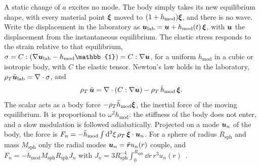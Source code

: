 A static change of $a$ excites no mode. The body simply takes its new equilibrium shape, with every material point $\bm{\xi}$ moved to $(1 + h_{\mathrm{mod}})\bm{\xi}$, and there is no wave. Write the displacement in the laboratory as $\bm{u}_{\mathrm{lab}} = \bm{u} + h_{\mathrm{mod}}(t)\,\bm{\xi}$, with $\bm{u}$ the displacement from the instantaneous equilibrium. The elastic stress responds to the strain relative to that equilibrium, $\sigma = C : (\nabla\vect{u}_{\mathrm{lab}} - h_{\mathrm{mod}}\mathbb{1}) = C : \nabla\vect{u}$, for a uniform $h_{\mathrm{mod}}$ in a cubic or isotropic body, with $C$ the elastic tensor. Newton's law holds in the laboratory, $\rho_T\ddot{\bm{u}}_{\mathrm{lab}} = \nabla\cdot\sigma$, and
\begin{equation}
  \rho_T\,\ddot{\bm{u}} = \nabla\cdot(C : \nabla\bm{u}) - \rho_T\,\ddot h_{\mathrm{mod}}\,\bm{\xi} .
  \label{eq:11.8-drive}
\end{equation}
The scalar acts as a body force $-\rho_T\ddot h_{\mathrm{mod}}\bm{\xi}$, the inertial force of the moving equilibrium. It is proportional to $\omega^2h_{\mathrm{mod}}$: the stiffness of the body does not enter, and a slow modulation is followed adiabatically. Projected on a mode $\bm{u}_n$ of the body, the force is $F_n = -\ddot h_{\mathrm{mod}}\int\mathrm{d}^3\xi\,\rho_T\,\bm{\xi}\cdot\bm{u}_n$. For a sphere of radius $R_{\mathrm{sph}}$ and mass $M_{\mathrm{sph}}$ only the radial modes $\bm{u}_n = \hat{\bm{r}}u_n(r)$ couple, and $F_n = -\ddot h_{\mathrm{mod}}M_{\mathrm{sph}}R_{\mathrm{sph}}J_n$ with $J_n = 3R_{\mathrm{sph}}^{-4}\int_0^{R_{\mathrm{sph}}}\dd r\,r^3u_n(r)$~\cite[Eqs.~(7), (8)]{arvanitaki2016sound}.

